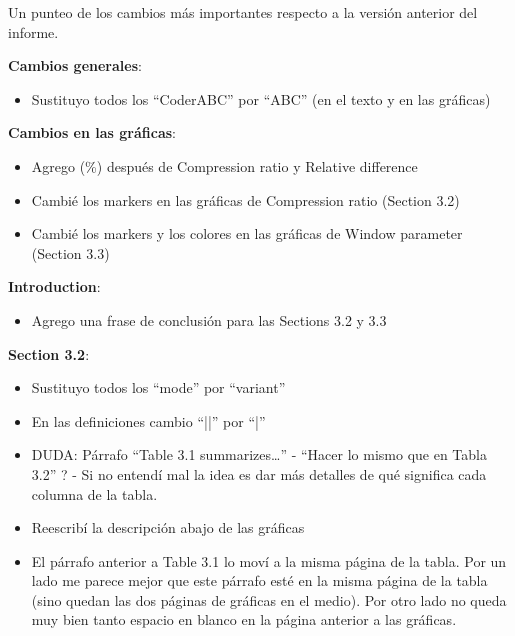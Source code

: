 \clearpage
Un punteo de los cambios más importantes respecto a la versión anterior del informe.


\vspace{+5pt}
\textbf{Cambios generales}:
\vspace{-10pt}
\begin{itemize}
    \item Sustituyo todos los “CoderABC” por “ABC” (en el texto y en las gráficas)
\end{itemize}


\vspace{+5pt}
\textbf{Cambios en las gráficas}:
\vspace{-10pt}
\begin{itemize}
    \item Agrego (\%) después de Compression ratio y Relative difference
    \item Cambié los markers en las gráficas de Compression ratio (Section 3.2) 
    \item Cambié los markers y los colores en las gráficas de Window parameter (Section 3.3) 
\end{itemize}


\vspace{+5pt}
\textbf{Introduction}:
\vspace{-10pt}
\begin{itemize}
    \item Agrego una frase de conclusión para las Sections 3.2 y 3.3
\end{itemize}


\vspace{+5pt}
\textbf{Section 3.2}:
\vspace{-10pt}
\begin{itemize}
    \item Sustituyo todos los “mode” por “variant”
    \item En las definiciones cambio “||” por “|”
    \item DUDA: Párrafo “Table 3.1 summarizes…” - “Hacer lo mismo que en Tabla 3.2” ? - Si no entendí mal la idea es dar más detalles de qué significa cada columna de la tabla.
    \item Reescribí la descripción abajo de las gráficas
    \item El párrafo anterior a Table 3.1 lo moví a la misma página de la tabla. Por un lado me parece mejor que este párrafo esté en la misma página de la tabla (sino quedan las dos páginas de gráficas en el medio). Por otro lado no queda muy bien tanto espacio en blanco en la página anterior a las gráficas.
\end{itemize}



